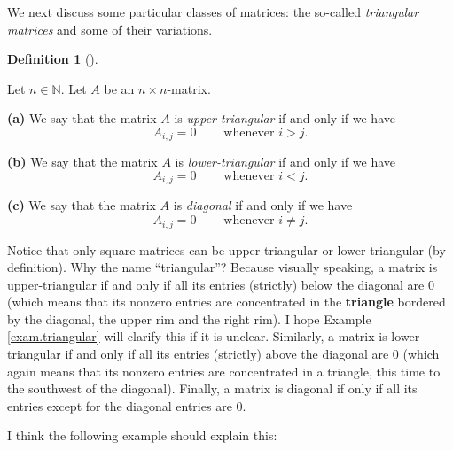 \documentclass[numbers=enddot,12pt,final,onecolumn,notitlepage]{scrartcl}%
\theoremstyle{definition}
\newtheorem{defi}[theo]{Definition}
\newenvironment{definition}[1][]
{\begin{defi}[#1]\begin{leftbar}}
{\end{leftbar}\end{defi}}
\begin{document}
We next discuss some particular classes of matrices: the so-called
\textit{triangular matrices} and some of their variations.

\begin{definition}
\label{def.triangular}Let $n\in\mathbb{N}$. Let $A$ be an $n\times n$-matrix.

\textbf{(a)} We say that the matrix $A$ is \textit{upper-triangular} if and
only if we have%
\[
A_{i,j}=0\ \ \ \ \ \ \ \ \ \ \text{whenever }i>j.
\]


\textbf{(b)} We say that the matrix $A$ is \textit{lower-triangular} if and
only if we have%
\[
A_{i,j}=0\ \ \ \ \ \ \ \ \ \ \text{whenever }i<j.
\]


\textbf{(c)} We say that the matrix $A$ is \textit{diagonal} if and only if we
have%
\[
A_{i,j}=0\ \ \ \ \ \ \ \ \ \ \text{whenever }i\neq j.
\]

\end{definition}

Notice that only square matrices can be upper-triangular or lower-triangular
(by definition). Why the name \textquotedblleft triangular\textquotedblright?
Because visually speaking, a matrix is upper-triangular if and only if all its
entries (strictly) below the diagonal are $0$ (which means that its nonzero
entries are concentrated in the \textbf{triangle} bordered by the diagonal,
the upper rim and the right rim). I hope Example \ref{exam.triangular} will
clarify this if it is unclear. Similarly, a matrix is lower-triangular if and
only if all its entries (strictly) above the diagonal are $0$ (which again
means that its nonzero entries are concentrated in a triangle, this time to
the southwest of the diagonal). Finally, a matrix is diagonal if only if all
its entries except for the diagonal entries are $0$.

I think the following example should explain this:
\end{document}
